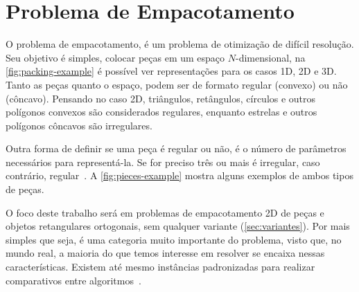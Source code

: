 \chapter{Problema de Empacotamento}\label{ch:problema-de-empacotamento}

O problema de empacotamento, é um problema de otimização de difícil resolução.
Seu objetivo é simples, colocar peças em um espaço $N$-dimensional, na \autoref{fig:packing-example} é possível ver representações para os casos 1D, 2D e 3D\@.
Tanto as peças quanto o espaço, podem ser de formato regular (convexo) ou não (côncavo).
Pensando no caso 2D, triângulos, retângulos, círculos e outros polígonos convexos são considerados regulares, enquanto estrelas e outros polígonos côncavos são irregulares.

Outra forma de definir se uma peça é regular ou não, é o número de parâmetros necessários para representá-la.
Se for preciso três ou mais é irregular, caso contrário, regular~\cite{aprendizado-reforco}.
A \autoref{fig:pieces-example} mostra alguns exemplos de ambos tipos de peças.

O foco deste trabalho será em problemas de empacotamento 2D de peças e objetos retangulares ortogonais, sem qualquer variante (\autoref{sec:variantes}).
Por mais simples que seja, é uma categoria muito importante do problema, visto que, no mundo real, a maioria do que temos interesse em resolver se encaixa nessas características.
Existem até mesmo instâncias padronizadas para realizar comparativos entre algoritmos~\cite{2DPackLib}.





